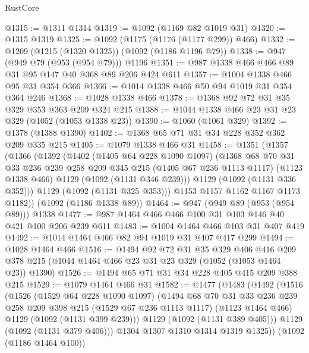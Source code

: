 \begin{lexlean}{RustCore}
\begin{coremodule}
@1315 := @1311 @1314
@1319 := @1092 (@1169 @82 @1019 @31)
@1320 := @1315 @1319
@1325 := @1092 (@1175 (@1176 (@1177 @299)) @466)
@1332 := @1209 (@1215 (@1320 @1325)) (@1092 (@1186 @1196 @79))
@1338 := @947 (@949 @79 (@953 (@954 @79))) @1196
@1351 := @987 @1338 @466 @466 @89 @31 @95 @147 @40 @368 @89 @206 @424 @611
@1357 := @1004 @1338 @466 @95 @31 @354 @366
@1366 := @1014 @1338 @466 @50 @94 @1019 @31 @354 @364 @246
@1368 := @1028 @1338 @466
@1378 := @1368 @92 @72 @31 @35 @329 @353 @363 @209 @324 @215
@1388 := @1044 @1338 @466 @23 @31 @23 @329 (@1052 (@1053 @1338 @23))
@1390 := @1060 (@1061 @329)
@1392 := @1378 (@1388 @1390)
@1402 := @1368 @65 @71 @31 @34 @228 @352 @362 @209 @335 @215
@1405 := @1079 @1338 @466 @31
@1458 := @1351
    (@1357
      (@1366
        (@1392
          (@1402
            (@1405 @64 @228 @1090 @1097)
            (@1368
              @68
              @70
              @31
              @33
              @236
              @239
              @258
              @209
              @345
              @215
              (@1405 @67 @236 @1113 @1117)
              (@1123 @1338 @466)
              @1129
              (@1092 (@1131 @346 @239)))
            @1129
            (@1092 (@1131 @336 @352)))
          @1129
          (@1092 (@1131 @325 @353)))
        @1153
        @1157
        @1162
        @1167
        @1173
        @1182))
    (@1092 (@1186 @1338 @89))
@1464 := @947 (@949 @89 (@953 (@954 @89))) @1338
@1477 := @987 @1464 @466 @466 @100 @31 @103 @146 @40 @421 @100 @206 @239 @611
@1483 := @1004 @1464 @466 @103 @31 @407 @419
@1492 := @1014 @1464 @466 @82 @94 @1019 @31 @407 @417 @299
@1494 := @1028 @1464 @466
@1516 := @1494
    @92
    @72
    @31
    @35
    @329
    @406
    @416
    @209
    @378
    @215
    (@1044 @1464 @466 @23 @31 @23 @329 (@1052 (@1053 @1464 @23)) @1390)
@1526 := @1494 @65 @71 @31 @34 @228 @405 @415 @209 @388 @215
@1529 := @1079 @1464 @466 @31
@1582 := @1477
    (@1483
      (@1492
        (@1516
          (@1526
            (@1529 @64 @228 @1090 @1097)
            (@1494
              @68
              @70
              @31
              @33
              @236
              @239
              @258
              @209
              @398
              @215
              (@1529 @67 @236 @1113 @1117)
              (@1123 @1464 @466)
              @1129
              (@1092 (@1131 @399 @239)))
            @1129
            (@1092 (@1131 @389 @405)))
          @1129
          (@1092 (@1131 @379 @406)))
        @1304
        @1307
        @1310
        @1314
        @1319
        @1325))
    (@1092 (@1186 @1464 @100))

\end{coremodule}
\end{lexlean}

